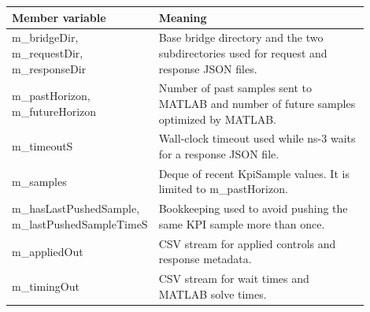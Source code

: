 \documentclass[11pt]{article}
\DeclareRobustCommand{\code}[1]{\texttt{\detokenize{#1}}}
\def\code#1{#1}%
\begin{document}
\begin{center}
\begin{longtable}{L{0.30\linewidth}L{0.60\linewidth}}
\toprule
Member variable & Meaning \\
\midrule
\endhead
\code{m_bridgeDir}, \code{m_requestDir}, \code{m_responseDir} &
Base bridge directory and the two subdirectories used for request and response
JSON files. \\
\code{m_pastHorizon}, \code{m_futureHorizon} &
Number of past samples sent to MATLAB and number of future samples optimized by
MATLAB. \\
\code{m_timeoutS} &
Wall-clock timeout used while ns-3 waits for a response JSON file. \\
\code{m_samples} &
Deque of recent \code{KpiSample} values.  It is limited to
\code{m_pastHorizon}. \\
\code{m_hasLastPushedSample}, \code{m_lastPushedSampleTimeS} &
Bookkeeping used to avoid pushing the same KPI sample more than once. \\
\code{m_appliedOut} &
CSV stream for applied controls and response metadata. \\
\code{m_timingOut} &
CSV stream for wait times and MATLAB solve times. \\
\bottomrule
\end{longtable}
\end{center}
\end{document}
